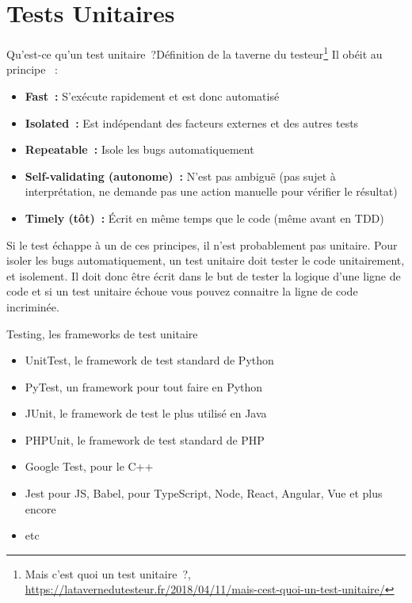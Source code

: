 \documentclass{beamer}
\begin{document}
    \section{Tests Unitaires}\label{sec:tests-unitaires}
    \begin{frame}{Qu’est-ce qu’un test unitaire~?}{Définition de la taverne du testeur\footnote{Mais c’est quoi un test unitaire~?, \url{https://latavernedutesteur.fr/2018/04/11/mais-cest-quoi-un-test-unitaire/}}}
        \transdissolve
        Il obéit au principe ~:
        \begin{itemize}
            \item \textbf{Fast~:} S’exécute rapidement et est donc automatisé
            \item \textbf{Isolated~:} Est indépendant des facteurs externes et des autres tests
            \item \textbf{Repeatable~:} Isole les bugs automatiquement
            \item \textbf{Self-validating (autonome)~:} N’est pas ambiguë (pas sujet à interprétation, ne demande pas une action manuelle pour vérifier le résultat)
            \item \textbf{Timely (tôt)~:} Écrit en même temps que le code (même avant en TDD)
        \end{itemize}
        Si le test échappe à un de ces principes, il n'est probablement pas unitaire.
        \bigbreak
        Pour isoler les bugs automatiquement, un test unitaire doit tester le code unitairement, et isolement.
        Il doit donc être écrit dans le but de tester la logique d’une ligne de code et si un test unitaire échoue vous pouvez connaitre la ligne de code incriminée.
    \end{frame}

    \begin{frame}{Testing, les frameworks de test unitaire}
        \begin{itemize}
            \item UnitTest, le framework de test standard de Python
            \item PyTest, un framework pour tout faire en Python
            \item JUnit, le framework de test le plus utilisé en Java
            \item PHPUnit, le framework de test standard de PHP
            \item Google Test, pour le C++
            \item Jest pour JS, Babel, pour TypeScript, Node, React, Angular, Vue et plus encore
            \item etc
        \end{itemize}
    \end{frame}
\end{document}
